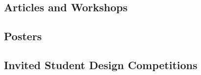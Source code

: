 \documentclass[margin,line]{res}
\let\resumesection\section
\begin{document}
\begin{resume}
\subsection{\sc Articles and Workshops}

\renewcommand{\section}[2]{}
\renewcommand{\section}{\resumesection}


\subsection{\sc Posters}

\renewcommand{\section}[2]{}
\renewcommand{\section}{\resumesection}

\subsection{\sc Invited Student Design Competitions}

\renewcommand{\section}[2]{}
\renewcommand{\section}{\resumesection}



\end{resume}
\end{document}
